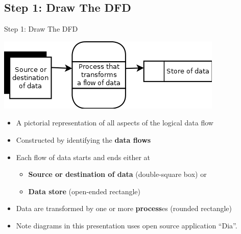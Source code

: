 \documentclass{beamer}
\begin{document}
	\subsection{Step 1: Draw The DFD}
	\begin{frame}{Step 1: Draw The DFD}
	    \begin{small}
    		\begin{center}
    			\includegraphics[scale=0.4]{img/01_dfd_symbols}
    		\end{center}	
    		\begin{itemize}
    			\item A pictorial representation of all aspects of the logical data flow
    			\item Constructed by identifying the \textbf{data flows}
    			\item Each flow of data starts and ends either at
    			\begin{itemize}
    				\item \textbf{Source or destination of data} (double-square box) or
    				\item \textbf{Data store} (open-ended rectangle)
    			\end{itemize}
    			\item Data are transformed by one or more \textbf{process}es (rounded rectangle)
    			\item Note diagrams in this presentation uses open source application ``Dia''.
    		\end{itemize}
		\end{small}
	\end{frame}
\end{document}
